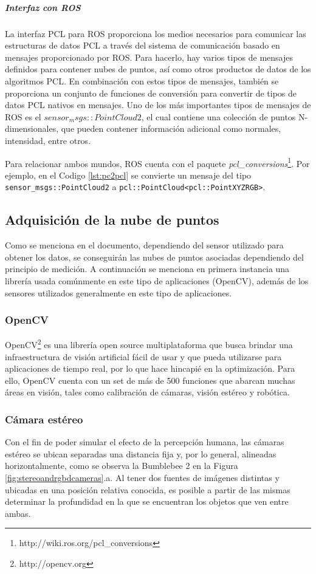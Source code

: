 \ifimagenes
\ifimagenespaper
\else
\subparagraph{Interfaz con ROS}
\fi
\fi
La interfaz PCL para ROS proporciona los medios necesarios para comunicar las estructuras de datos PCL a través del sistema de comunicación basado en mensajes proporcionado por ROS. Para hacerlo, hay varios tipos de mensajes definidos para contener nubes de puntos, así como otros productos de datos de los algoritmos PCL. En combinación con estos tipos de mensajes, también se proporciona un conjunto de funciones de conversión para convertir de tipos de datos PCL nativos en mensajes. Uno de los más importantes tipos de mensajes de ROS es el $sensor_msgs::PointCloud2$, el cual contiene una colección de puntos N-dimensionales, que pueden contener información adicional como normales, intensidad, entre otros.

Para relacionar ambos mundos, ROS cuenta con el paquete \textit{pcl\_conversions}\footnote{http://wiki.ros.org/pcl\_conversions}. Por ejemplo, en el Codigo \ref{lst:pc2pcl} se convierte un mensaje del tipo \lstinline{sensor_msgs::PointCloud2} a \lstinline{pcl::PointCloud<pcl::PointXYZRGB>}.




\subsection{Adquisición de la nube de puntos}
Como se menciona en el documento, dependiendo del sensor utilizado para obtener los datos, se conseguirán las nubes de puntos asociadas dependiendo del principio de medición. A continuación se menciona en primera instancia una librería usada comúnmente en este tipo de aplicaciones (OpenCV), además de los sensores utilizados generalmente en este tipo de aplicaciones.

\subsubsection{OpenCV}
OpenCV\footnote{http://opencv.org} es una librería open source multiplataforma que busca brindar una infraestructura de visión artificial fácil de usar y que pueda utilizarse para aplicaciones de tiempo real, por lo que hace hincapié en la optimización. Para ello, OpenCV cuenta con un set de más de 500 funciones \cite{kaehler2017} que abarcan muchas áreas en visión, tales como calibración de cámaras, visión estéreo y robótica.

\subsubsection{Cámara estéreo}
Con el fin de poder simular el efecto de la percepción humana, las cámaras estéreo se ubican separadas una distancia fija y, por lo general, alineadas horizontalmente, como se observa la Bumblebee 2 en la Figura \ref{fig:stereoandrgbdcameras}.a. Al tener dos fuentes de imágenes distintas y ubicadas en una posición relativa conocida, es posible a partir de las mismas determinar la profundidad en la que se encuentran los objetos que ven entre ambas. 

